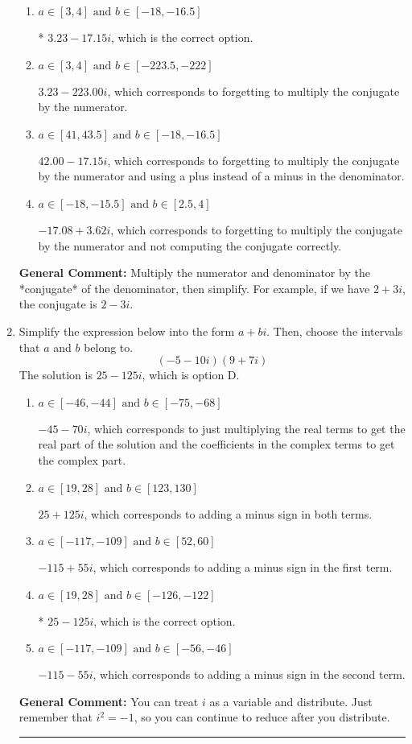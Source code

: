 \documentclass{extbook}[14pt]
\newcommand{\litem}[1]{\item #1

\rule{\textwidth}{0.4pt}}
\begin{document}
\begin{enumerate}
{\begin{enumerate}[label=\Alph*.]
 $-22.50  + 14.67 i$, which corresponds to just dividing the first term by the first term and the second by the second.
\item \( a \in [3, 4] \text{ and } b \in [-18, -16.5] \)

* $3.23  - 17.15 i$, which is the correct option.
\item \( a \in [3, 4] \text{ and } b \in [-223.5, -222] \)

 $3.23  - 223.00 i$, which corresponds to forgetting to multiply the conjugate by the numerator.
\item \( a \in [41, 43.5] \text{ and } b \in [-18, -16.5] \)

 $42.00  - 17.15 i$, which corresponds to forgetting to multiply the conjugate by the numerator and using a plus instead of a minus in the denominator.
\item \( a \in [-18, -15.5] \text{ and } b \in [2.5, 4] \)

 $-17.08  + 3.62 i$, which corresponds to forgetting to multiply the conjugate by the numerator and not computing the conjugate correctly.
\end{enumerate}

\textbf{General Comment:} Multiply the numerator and denominator by the *conjugate* of the denominator, then simplify. For example, if we have $2+3i$, the conjugate is $2-3i$.
}
\litem{
Simplify the expression below into the form $a+bi$. Then, choose the intervals that $a$ and $b$ belong to.
\[ (-5 - 10 i)(9 + 7 i) \]The solution is \( 25 - 125 i \), which is option D.\begin{enumerate}[label=\Alph*.]
\item \( a \in [-46, -44] \text{ and } b \in [-75, -68] \)

 $-45 - 70 i$, which corresponds to just multiplying the real terms to get the real part of the solution and the coefficients in the complex terms to get the complex part.
\item \( a \in [19, 28] \text{ and } b \in [123, 130] \)

 $25 + 125 i$, which corresponds to adding a minus sign in both terms.
\item \( a \in [-117, -109] \text{ and } b \in [52, 60] \)

 $-115 + 55 i$, which corresponds to adding a minus sign in the first term.
\item \( a \in [19, 28] \text{ and } b \in [-126, -122] \)

* $25 - 125 i$, which is the correct option.
\item \( a \in [-117, -109] \text{ and } b \in [-56, -46] \)

 $-115 - 55 i$, which corresponds to adding a minus sign in the second term.
\end{enumerate}

\textbf{General Comment:} You can treat $i$ as a variable and distribute. Just remember that $i^2=-1$, so you can continue to reduce after you distribute.
}
\end{enumerate}
\end{document}
